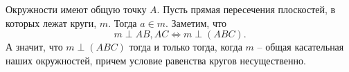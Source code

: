 Окружности имеют общую точку $A$. Пусть прямая пересечения плоскостей, в которых лежат круги, $m$. Тогда $a\in m$. Заметим, что 
\begin{equation}
	m\perp AB, AC \Leftrightarrow m\perp (ABC).
\end{equation}
А значит, что $m\perp (ABC)$ тогда и только тогда, когда $m$ -- общая касательная наших окружностей, причем условие равенства кругов несущественно.